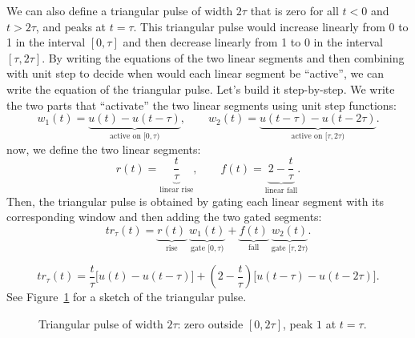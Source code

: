 \documentclass{ee102_notes}
\begin{document}
We can also define a triangular pulse of width $2\tau$ that is zero for all $t < 0$ and $t > 2\tau$, and peaks at $t = \tau$. This triangular pulse would increase linearly from 0 to 1 in the interval $[0, \tau]$ and then decrease linearly from 1 to 0 in the interval $[\tau, 2\tau]$. By writing the equations of the two linear segments and then combining with unit step to decide when would each linear segment be ``active'', we can write the equation of the triangular pulse. Let's build it step-by-step. We write the two parts that ``activate'' the two linear segments using unit step functions:
\[
w_1(t)=\underbrace{u(t)-u(t-\tau)}_{\text{active on }[0,\tau)},\qquad
w_2(t)=\underbrace{u(t-\tau)-u(t-2\tau)}_{\text{active on }[\tau,2\tau)}.
\]
now, we define the two linear segments:
\[
r(t)=\underbrace{\frac{t}{\tau}}_{\text{linear rise}},\qquad
f(t)=\underbrace{2-\frac{t}{\tau}}_{\text{linear fall}}.
\]
Then, the triangular pulse is obtained by gating each linear segment with its corresponding window and then adding the two gated segments:
\[
tr_\tau(t)
=\underbrace{r(t)}_{\text{rise}}\;\underbrace{w_1(t)}_{\text{gate }[0,\tau)}
+\underbrace{f(t)}_{\text{fall}}\;\underbrace{w_2(t)}_{\text{gate }[\tau,2\tau)}.
\]

\[
tr_\tau(t)
=\frac{t}{\tau}\big[u(t)-u(t-\tau)\big]
+\left(2-\frac{t}{\tau}\right)\big[u(t-\tau)-u(t-2\tau)\big].
\]
See Figure~\ref{fig:tri_pulse} for a sketch of the triangular pulse.
\begin{figure}[h!]
  \centering
  \caption{Triangular pulse of width $2\tau$: zero outside $[0,2\tau]$, peak $1$ at $t=\tau$.}
  \label{fig:tri_pulse}
\end{figure}
\end{document}
